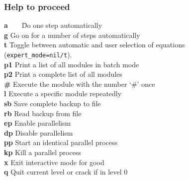 \documentclass[12pt]{article}
\begin{document}
\subsubsection{Help to proceed} 
\begin{tabbing}
  {\bf a}\ \ \ \ \= Do one step automatically      \\        
  {\bf g}    \> Go on for a number of steps automatically    \\
  {\bf t}    \> Toggle between automatic and user selection of 
                equations ({\tt expert\_mode=nil/t}).  \\
  {\bf p1}   \> Print a list of all modules in batch mode \\
  {\bf p2}   \> Print a complete list of all modules \\
  {\bf \#}   \> Execute the module with the number `\#' once  \\
  {\bf l}    \> Execute a specific module repeatedly         \\
  {\bf sb}   \> Save complete backup to file \\
  {\bf rb}   \> Read backup from file \\
  {\bf ep}   \> Enable parallelism \\
  {\bf dp}   \> Disable parallelism \\
  {\bf pp}   \> Start an identical parallel process \\
  {\bf kp}   \> Kill a parallel process \\
  {\bf x}    \> Exit interactive mode for good            \\
  {\bf q}    \> Quit current level or crack if in level 0   
\end{tabbing}
\end{document}
